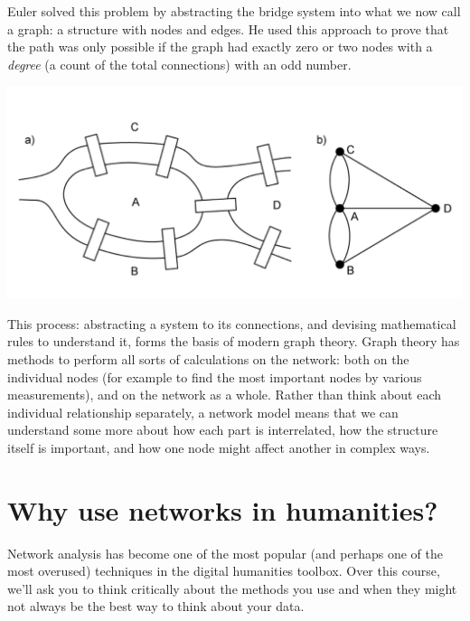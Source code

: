 \documentclass[
]{book}
\begin{document}
Euler solved this problem by abstracting the bridge system into what we now call a graph: a structure with nodes and edges. He used this approach to prove that the path was only possible if the graph had exactly zero or two nodes with a \emph{degree} (a count of the total connections) with an odd number.

\includegraphics{images/Screenshot 2022-09-26 at 11.25.49.png}

This process: abstracting a system to its connections, and devising mathematical rules to understand it, forms the basis of modern graph theory. Graph theory has methods to perform all sorts of calculations on the network: both on the individual nodes (for example to find the most important nodes by various measurements), and on the network as a whole. Rather than think about each individual relationship separately, a network model means that we can understand some more about how each part is interrelated, how the structure itself is important, and how one node might affect another in complex ways.

\hypertarget{why-use-networks-in-humanities}{%
\section{Why use networks in humanities?}\label{why-use-networks-in-humanities}}

Network analysis has become one of the most popular (and perhaps one of the most overused) techniques in the digital humanities toolbox. Over this course, we'll ask you to think critically about the methods you use and when they might not always be the best way to think about your data.
\end{document}
